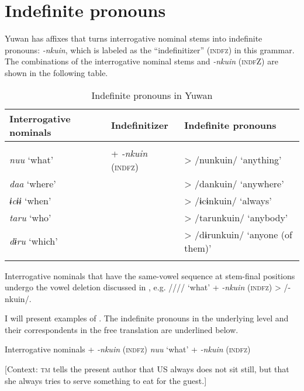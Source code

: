 \section{Indefinite pronouns}

Yuwan has affixes that turns interrogative nominal stems into indefinite pronouns: \textit{{}-nkuin}, which is labeled as the “indefinitizer” (\textsc{indfz}) in this grammar. The combinations of the interrogative nominal stems and \textit{-nkuin} (\textsc{indf}Z) are shown in the following table.

\begin{table}
\caption{\label{tab:key:54} Indefinite pronouns in Yuwan}
\begin{tabular}{lll}
Interrogative nominals  &   Indefinitizer    & Indefinite pronouns\\
\midrule                                                                                                \\
\textit{nuu}  ‘what’   & +  \textit{{}-nkuin} (\textsc{indfz})&  >  /nunkuin/  ‘anything’               \\
\textit{daa}  ‘where’  &                                      &  >  /dankuin/  ‘anywhere’               \\
\textit{ɨcɨɨ}  ‘when’  &                                      &  >  /ɨcɨnkuin/  ‘always’                \\
\textit{taru}  ‘who’   &                                      & >  /tarunkuin/  ‘anybody’               \\
\textit{dɨru}  ‘which’ &                                      &   >  /dɨrunkuin/  ‘anyone (of them)’    \\
\lspbottomrule
\end{tabular}
\end{table}

Interrogative nominals that have the same-vowel sequence at stem-final positions undergo the vowel deletion discussed in , e.g. //// ‘what’ + \textit{{}-nkuin} (\textsc{indfz}) > /-nkuin/.

  I will present examples of . The indefinite pronouns in the underlying level and their correspondents in the free translation are underlined below.

\ea \label{ex:7:22}  Interrogative nominals + \textit{{}-nkuin} (\textsc{indfz})
\ea \label{ex:7:22a}\textit{nuu} ‘what’ + \textit{{}-nkuin} (\textsc{indfz})

    [Context: \textsc{tm} tells the present author that US always does not sit still, but that she always tries to serve something to eat for the guest.]


